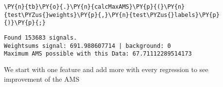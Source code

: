 
{\par%
\vspace{-1\baselineskip}%
}%
\begin{notebookcell}[]%
\begin{addmargin}[\cellleftmargin]{0em}%
{\smaller%
\par%
%
\vspace{-1\smallerfontscale}%
\begin{Verbatim}[commandchars=\\\{\}]
\PY{n}{tb}\PY{o}{.}\PY{n}{calcMaxAMS}\PY{p}{(}\PY{n}{test\PYZus{}weights}\PY{p}{,}\PY{n}{test\PYZus{}labels}\PY{p}{)}\PY{p}{;}
\end{Verbatim}
%
\par%
\vspace{-1\smallerfontscale}}%
\end{addmargin}
\end{notebookcell}

\par\vspace{1\smallerfontscale}%
    \begin{addmargin}[\cellleftmargin]{0em}%
    {\smaller%
    \vspace{-1\smallerfontscale}%
    
    \begin{Verbatim}[commandchars=\\\{\}]
Found 153683 signals.
Weightsums signal: 691.988607714 | background: 0
Maximum AMS possible with this Data: 67.71112289514173
    \end{Verbatim}
}%
    \end{addmargin}%
    We start with one feature and add more with every regression to see
improvement of the AMS


